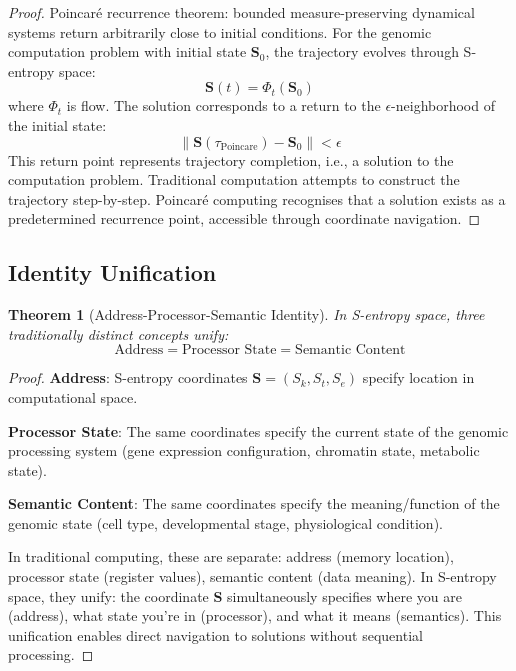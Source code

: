 \documentclass[11pt,a4paper]{article}
\newtheorem{theorem}{Theorem}[section]
\theoremstyle{remark}
\newcommand{\Sk}{S_k}
\newcommand{\St}{S_t}
\newcommand{\Se}{S_e}
\newcommand{\Scoord}{\mathbf{S}}
\begin{document}
\begin{proof}
Poincaré recurrence theorem: bounded measure-preserving dynamical systems return arbitrarily close to initial conditions. For the genomic computation problem with initial state $\Scoord_0$, the trajectory evolves through S-entropy space:
\begin{equation}
\Scoord(t) = \Phi_t(\Scoord_0)
\end{equation}
where $\Phi_t$ is flow. The solution corresponds to a return to the $\epsilon$-neighborhood of the initial state:
\begin{equation}
\|\Scoord(\tau_{\text{Poincare}}) - \Scoord_0\| < \epsilon
\end{equation}
This return point represents trajectory completion, i.e., a solution to the computation problem. Traditional computation attempts to construct the trajectory step-by-step. Poincaré computing recognises that a solution exists as a predetermined recurrence point, accessible through coordinate navigation.
\end{proof}

\subsection{Identity Unification}

\begin{theorem}[Address-Processor-Semantic Identity]
\label{thm:identity_unification}
In S-entropy space, three traditionally distinct concepts unify:
\begin{equation}
\text{Address} = \text{Processor State} = \text{Semantic Content}
\end{equation}
\end{theorem}

\begin{proof}
\textbf{Address}: S-entropy coordinates $\Scoord = (\Sk, \St, \Se)$ specify location in computational space.

\textbf{Processor State}: The same coordinates specify the current state of the genomic processing system (gene expression configuration, chromatin state, metabolic state).

\textbf{Semantic Content}: The same coordinates specify the meaning/function of the genomic state (cell type, developmental stage, physiological condition).

In traditional computing, these are separate: address (memory location), processor state (register values), semantic content (data meaning). In S-entropy space, they unify: the coordinate $\Scoord$ simultaneously specifies where you are (address), what state you're in (processor), and what it means (semantics). This unification enables direct navigation to solutions without sequential processing.
\end{proof}
\end{document}
